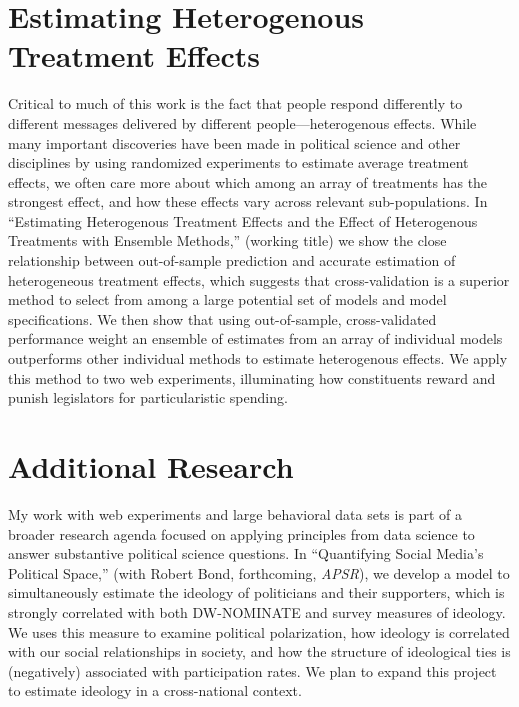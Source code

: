 \documentclass[12pt]{article}
\begin{document}
\section*{Estimating Heterogenous Treatment Effects}
Critical to much of this work is the fact that people respond differently to different messages delivered by different people---heterogenous effects.  While many important discoveries have been made in political science and other disciplines by using randomized experiments to estimate average treatment effects, we often care more about which among an array of treatments has the strongest effect, and how these effects vary across relevant sub-populations.  In ``Estimating Heterogenous Treatment Effects and the Effect of Heterogenous Treatments with Ensemble Methods,'' (working title) we show the close relationship between out-of-sample prediction and accurate estimation of heterogeneous treatment effects, which suggests that cross-validation is a superior method to select from among a large potential set of models and model specifications.  We then show that using out-of-sample, cross-validated performance weight an ensemble of estimates from an array of individual models outperforms other individual methods to estimate heterogenous effects.  We apply this method to two web experiments, illuminating how constituents reward and punish legislators for particularistic spending.  

\section*{Additional Research}
My work with web experiments and large behavioral data sets is part of a broader research agenda focused on applying principles from data science to answer substantive political science questions.  In ``Quantifying Social Media's Political Space,'' (with Robert Bond, forthcoming, \emph{APSR}), we develop a model to simultaneously estimate the ideology of politicians and their supporters, which is strongly correlated with both DW-NOMINATE and survey measures of ideology.  We uses this measure to examine political polarization, how ideology is correlated with our social relationships in society, and how the structure of ideological ties is (negatively) associated with participation rates.  We plan to expand this project to estimate ideology in a cross-national context.  
\end{document}
